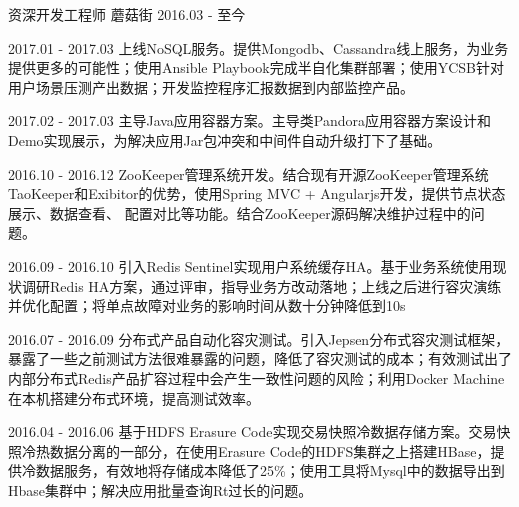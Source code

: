 

\begin{cventries}

  \cventry
    {资深开发工程师} %
    {蘑菇街} %
    {} %
    {2016.03 - 至今} %
    {
      \begin{cvitems} %
        \item {2017.01 - 2017.03 上线NoSQL服务。提供Mongodb、Cassandra线上服务，为业务提供更多的可能性；使用Ansible Playbook完成半自化集群部署；使用YCSB针对用户场景压测产出数据；开发监控程序汇报数据到内部监控产品。}
        \item {2017.02 - 2017.03 主导Java应用容器方案。主导类Pandora应用容器方案设计和Demo实现展示，为解决应用Jar包冲突和中间件自动升级打下了基础。}
        \item {2016.10 - 2016.12 ZooKeeper管理系统开发。结合现有开源ZooKeeper管理系统TaoKeeper和Exibitor的优势，使用Spring MVC + Angularjs开发，提供节点状态展示、数据查看、 配置对比等功能。结合ZooKeeper源码解决维护过程中的问题。}
        \item {2016.09 - 2016.10 引入Redis Sentinel实现用户系统缓存HA。基于业务系统使用现状调研Redis HA方案，通过评审，指导业务方改动落地；上线之后进行容灾演练并优化配置；将单点故障对业务的影响时间从数十分钟降低到10s}
        \item {2016.07 - 2016.09 分布式产品自动化容灾测试。引入Jepsen分布式容灾测试框架，暴露了一些之前测试方法很难暴露的问题，降低了容灾测试的成本；有效测试出了内部分布式Redis产品扩容过程中会产生一致性问题的风险；利用Docker Machine在本机搭建分布式环境，提高测试效率。}
        \item {2016.04 - 2016.06 基于HDFS Erasure Code实现交易快照冷数据存储方案。交易快照冷热数据分离的一部分，在使用Erasure Code的HDFS集群之上搭建HBase，提供冷数据服务，有效地将存储成本降低了25\%；使用工具将Mysql中的数据导出到Hbase集群中；解决应用批量查询Rt过长的问题。}
      \end{cvitems}
    }


\end{cventries}
